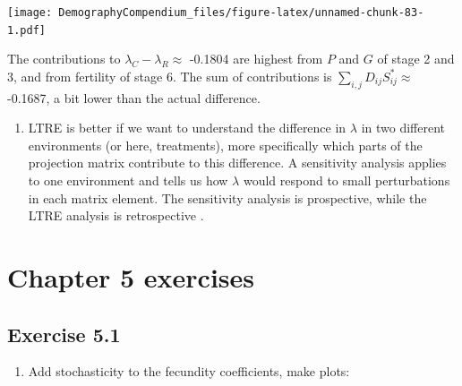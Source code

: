 \documentclass[
]{book}
\providecommand{\tightlist}{%
  \setlength{\itemsep}{0pt}\setlength{\parskip}{0pt}}
\begin{document}
\texttt{[image: DemographyCompendium\_files/figure-latex/unnamed-chunk-83-1.pdf]}

The contributions to \(\lambda_C-\lambda_R\approx\) -0.1804 are highest from \(P\) and \(G\) of stage 2 and 3, and from fertility of stage 6. The sum of contributions is \(\sum_{i,j}D_{ij}S^*_{ij}\approx\) -0.1687, a bit lower than the actual difference.

\begin{enumerate}
\def\labelenumi{\arabic{enumi}.}
\setcounter{enumi}{4}
\tightlist
\item
  LTRE is better if we want to understand the difference in \(\lambda\) in two different environments (or here, treatments), more specifically which parts of the projection matrix contribute to this difference. A sensitivity analysis applies to one environment and tells us how \(\lambda\) would respond to small perturbations in each matrix element. The sensitivity analysis is prospective, while the LTRE analysis is retrospective \citep{Caswell1}.
\end{enumerate}

\hypertarget{chapter-5-exercises}{%
\section{Chapter 5 exercises}\label{chapter-5-exercises}}

\hypertarget{exercise-5.1-1}{%
\subsection*{Exercise 5.1}\label{exercise-5.1-1}}

\begin{enumerate}
\def\labelenumi{\arabic{enumi}.}
\tightlist
\item
  Add stochasticity to the fecundity coefficients, make plots:
\end{enumerate}
\end{document}
